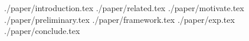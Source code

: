 \documentclass[format=acmsmall, review=false, screen=true]{acmart}
\begin{document}





\maketitle

%
 {./paper/introduction.tex}
 {./paper/related.tex}
 {./paper/motivate.tex}
 {./paper/preliminary.tex}
 {./paper/framework.tex}
 {./paper/exp.tex}
 {./paper/conclude.tex}







\end{document}
